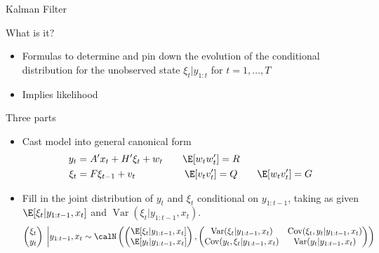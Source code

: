\documentclass[handout]{beamer}
\newcommand{\Cov}{\operatorname{Cov}}
\newcommand{\Var}{\operatorname{Var}}
\begin{document}
\begin{frame}[shrink]{Kalman Filter}

What is it?
\begin{itemize}
  \item Formulas to determine and pin down the evolution of the
    conditional distribution for the unobserved state $\xi_t|y_{1:t}$
    for $t=1,\ldots,T$
  \item Implies likelihood
\end{itemize}
Three parts
\begin{itemize}
  \item Cast model into general canonical form
    \begin{align*}
      y_t
      &=
      A'x_t
      + H'\xi_t
      + w_t
      \qquad
      \E[w_tw_t'] = R
      \\
      \xi_t
      &=
      F
      \xi_{t-1}
      + v_t
      \qquad
      \qquad
      \quad
      \E[v_tv_t'] = Q
      \qquad
      \E[w_tv_t']=G
    \end{align*}

  \item
    Fill in the joint distribution of $y_t$ and $\xi_t$ conditional
    on $y_{1:t-1}$, taking as given
    $\E[\xi_t|y_{1:t-1},x_t]$ and $\Var(\xi_t|y_{1:t-1},x_t)$.
    \begin{align*}
      \begin{pmatrix}
        \xi_t \\
        y_t
      \end{pmatrix}
      \;\bigg|
      y_{1:t-1},x_t
      \sim
      \calN\left(
      \begin{pmatrix}
        \E[\xi_t| y_{1:t-1},x_t]
        \\
        \E[y_t| y_{1:t-1},x_t]
      \end{pmatrix}
      ,
      \begin{pmatrix}
        \Var(\xi_t| y_{1:t-1},x_t) & \Cov(\xi_t,y_t| y_{1:t-1},x_t) \\
        \Cov(y_t,\xi_t| y_{1:t-1},x_t) & \Var(y_t|y_{1:t-1},x_t) \\
      \end{pmatrix}
      \right)
    \end{align*}


\end{itemize}
\end{frame}
\end{document}
